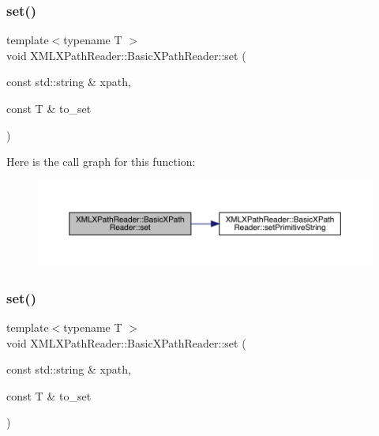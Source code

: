 \mbox{\label{classXMLXPathReader_1_1BasicXPathReader_a4cf7407f107bf4f307b70af4cccbd30e}} 
\subsubsection{\texorpdfstring{set()}{set()}\hspace{0.1cm}{\footnotesize\ttfamily [1/2]}}
{\footnotesize\ttfamily template$<$typename T $>$ \\
void X\+M\+L\+X\+Path\+Reader\+::\+Basic\+X\+Path\+Reader\+::set (\begin{DoxyParamCaption}\item[{const std\+::string \&}]{xpath,  }\item[{const T \&}]{to\+\_\+set }\end{DoxyParamCaption})\hspace{0.3cm}{\ttfamily [inline]}}

Here is the call graph for this function\+:
\nopagebreak
\begin{figure}[H]
\begin{center}
\leavevmode
\includegraphics[width=350pt]{d6/dbf/classXMLXPathReader_1_1BasicXPathReader_a4cf7407f107bf4f307b70af4cccbd30e_cgraph}
\end{center}
\end{figure}
\mbox{\label{classXMLXPathReader_1_1BasicXPathReader_a4cf7407f107bf4f307b70af4cccbd30e}} 
\subsubsection{\texorpdfstring{set()}{set()}\hspace{0.1cm}{\footnotesize\ttfamily [2/2]}}
{\footnotesize\ttfamily template$<$typename T $>$ \\
void X\+M\+L\+X\+Path\+Reader\+::\+Basic\+X\+Path\+Reader\+::set (\begin{DoxyParamCaption}\item[{const std\+::string \&}]{xpath,  }\item[{const T \&}]{to\+\_\+set }\end{DoxyParamCaption})\hspace{0.3cm}{\ttfamily [inline]}}

